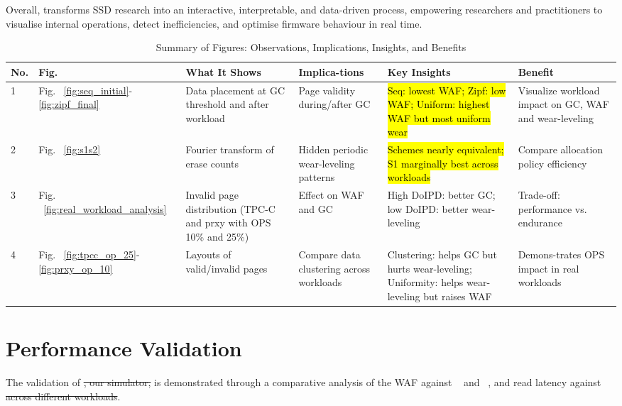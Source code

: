 \documentclass{ieeeaccess}
\begin{document}
Overall, \eyanassdsim transforms SSD research into an interactive, interpretable, and data-driven process, empowering researchers and practitioners to visualise internal operations, detect inefficiencies, and optimise firmware behaviour in real time.
\begin{table}
    \centering
    \caption{Summary of Figures: Observations, Implications, Insights, and Benefits}
    \label{table:all_figure_analysis}
    \begin{tabular}{|p{0.19cm}|p{0.3cm}|p{1.4cm}|p{1cm}|p{1.8cm}|p{1.2cm}|}
        \hline
        \textbf{No.} & \textbf{ Fig.} & \textbf{ What It Shows} & \textbf{ Implica-tions} & \textbf{ Key Insights} & \textbf{ Benefit} \\
        \hline
         1 & Fig. ~\ref{fig:seq_initial}-\ref{fig:zipf_final} &  Data placement at GC threshold and after workload &  Page validity during/after GC &  \hl{Seq: lowest WAF; Zipf: low WAF; Uniform: highest WAF but most uniform wear} &  Visualize workload impact on GC, WAF and wear-leveling \\
        \hline
         2 & Fig. ~\ref{fig:s1s2} &  Fourier transform of erase counts &  Hidden periodic wear-leveling patterns &  \hl{Schemes nearly equivalent; S1 marginally best across workloads} &  Compare allocation policy efficiency \\
        \hline
         3 & Fig. ~\ref{fig:real_workload_analysis}&  Invalid page distribution (TPC-C and prxy with OPS 10\% and 25\%) &  Effect on WAF and GC &  High DoIPD: better GC; low DoIPD: better wear-leveling &  Trade-off: performance vs. endurance \\
        \hline
         4 & Fig. ~\ref{fig:tpcc_op_25}-\ref{fig:prxy_op_10} &  Layouts of valid/invalid pages &  Compare data clustering across workloads &  Clustering: helps GC but hurts wear-leveling; Uniformity: helps wear-leveling but raises WAF &  Demons-trates OPS impact in real workloads \\
        \hline
    \end{tabular}
\end{table}

\section{Performance Validation}
\label{performance_validation}

The validation of \eyanassdsim\sout{, our simulator,} is demonstrated through a comparative analysis of the WAF against \ftlsim~\cite{FTLSim-ACM-2017} and \femu~\cite{FEMU-FAST-18}, and read latency against \femu \sout{across different workloads}.
\end{document}
